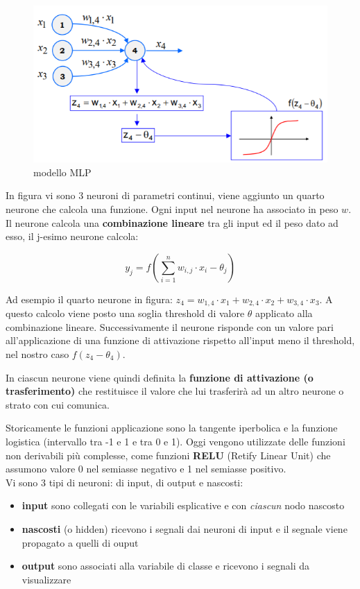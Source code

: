 \begin{figure}[H]
	\hspace{-0.5cm}
	\includegraphics[height=0.45 \linewidth]{classification/pict/mlp.png}
	\caption{modello MLP}
\end{figure}

In figura vi sono 3 neuroni di parametri continui, viene aggiunto un quarto neurone che calcola una funzione. Ogni input nel neurone ha associato in peso $w$.
Il neurone calcola una \textbf{combinazione lineare} tra gli input ed il peso dato ad esso, il j-esimo neurone calcola: 

\[ y_j = f(\sum_{i=1}^{n} w_{i,j} \cdot x_i - \theta_j)\] 

Ad esempio il quarto neurone in figura:  $z_4 = w_{1,4} \cdot x_1 + w_{2,4} \cdot x_2 +w_{3,4} \cdot x_3$.
A questo calcolo viene posto una soglia threshold di valore
$\theta$ applicato alla combinazione lineare. Successivamente il neurone risponde con un valore pari all'applicazione di una funzione di attivazione rispetto all'input meno il threshold, 
nel nostro caso $f(z_4-\theta_4)$. 

\begin{defn}
	In ciascun neurone viene quindi definita la \textbf{funzione di attivazione (o trasferimento)} che restituisce il valore che lui trasferir\`a ad un altro neurone o strato con cui comunica. 
\end{defn}Storicamente le funzioni applicazione sono la tangente iperbolica e la funzione logistica (intervallo tra -1 e 1 e tra 0 e 1). Oggi vengono utilizzate delle funzioni non derivabili pi\`u complesse, come funzioni \textbf{RELU} (Retify Linear Unit) che assumono valore 0 nel semiasse negativo e 1 nel semiasse positivo.
\\

Vi sono 3 tipi di neuroni: di input, di output e nascosti:
\begin{itemize}
	\item \textbf{input} sono collegati con le variabili esplicative e con \textit{ciascun} nodo nascosto
	\item \textbf{nascosti} (o hidden) ricevono i segnali dai neuroni di input e il segnale viene propagato a quelli di ouput
	\item \textbf{output} sono associati alla variabile di classe e ricevono i segnali da visualizzare
\end{itemize}

